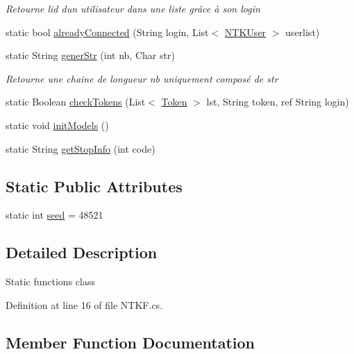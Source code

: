\begin{DoxyCompactItemize}
\begin{DoxyCompactList}\small\item\em Retourne l\textquotesingle{}id d\textquotesingle{}un utilisateur dans une liste grâce à son login \end{DoxyCompactList}\item 
static bool \mbox{\hyperlink{class_n_t_k_1_1_other_1_1_n_t_k_f_abe1220a3c53c061e7c5f69eba07865d0}{already\+Connected}} (String login, List$<$ \mbox{\hyperlink{class_n_t_k_1_1_n_t_k_user}{N\+T\+K\+User}} $>$ userlist)
\item 
static String \mbox{\hyperlink{class_n_t_k_1_1_other_1_1_n_t_k_f_a02db7f272a4f472f9835b2af24f686bf}{gener\+Str}} (int nb, Char str)
\begin{DoxyCompactList}\small\item\em Retourne une chaine de longueur nb uniquement composé de str \end{DoxyCompactList}\item 
static Boolean \mbox{\hyperlink{class_n_t_k_1_1_other_1_1_n_t_k_f_ad0ca5d6482837544e492d82bc8b046b4}{check\+Tokens}} (List$<$ \mbox{\hyperlink{class_n_t_k_1_1_other_1_1_token}{Token}} $>$ lst, String token, ref String login)
\item 
static void \mbox{\hyperlink{class_n_t_k_1_1_other_1_1_n_t_k_f_a893317d7db3f972ce52bfc1c947116b1}{init\+Models}} ()
\item 
static String \mbox{\hyperlink{class_n_t_k_1_1_other_1_1_n_t_k_f_af06dcd3fe11535a14e534371d2f65600}{get\+Stop\+Info}} (int code)
\end{DoxyCompactItemize}
\subsection*{Static Public Attributes}
\begin{DoxyCompactItemize}
\item 
static int \mbox{\hyperlink{class_n_t_k_1_1_other_1_1_n_t_k_f_a99efcb73a5df254faeb3e4e049548dc2}{seed}} = 48521
\end{DoxyCompactItemize}


\subsection{Detailed Description}
Static functions class 



Definition at line 16 of file N\+T\+K\+F.\+cs.



\subsection{Member Function Documentation}
\mbox{\label{class_n_t_k_1_1_other_1_1_n_t_k_f_abe1220a3c53c061e7c5f69eba07865d0}} 
